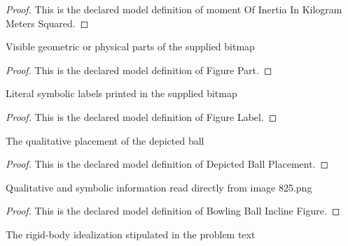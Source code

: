 \begin{proof}
  This is the declared model definition of moment Of Inertia In Kilogram Meters Squared.
\end{proof}
\begin{definition}
  \label{def:physics:phyx-mini-0825:phyxminiproblems-problemphyxmini0825-figurepart}
  Visible geometric or physical parts of the supplied bitmap
\end{definition}
\begin{proof}
  This is the declared model definition of Figure Part.
\end{proof}
\begin{definition}
  \label{def:physics:phyx-mini-0825:phyxminiproblems-problemphyxmini0825-figurelabel}
  Literal symbolic labels printed in the supplied bitmap
\end{definition}
\begin{proof}
  This is the declared model definition of Figure Label.
\end{proof}
\begin{definition}
  \label{def:physics:phyx-mini-0825:phyxminiproblems-problemphyxmini0825-depictedballplacement}
  The qualitative placement of the depicted ball
\end{definition}
\begin{proof}
  This is the declared model definition of Depicted Ball Placement.
\end{proof}
\begin{definition}
  \label{def:physics:phyx-mini-0825:phyxminiproblems-problemphyxmini0825-bowlingballinclinefigure}
  Qualitative and symbolic information read directly from image 825.png
\end{definition}
\begin{proof}
  This is the declared model definition of Bowling Ball Incline Figure.
\end{proof}
\begin{definition}
  \label{def:physics:phyx-mini-0825:phyxminiproblems-problemphyxmini0825-ballmodel}
  The rigid-body idealization stipulated in the problem text
\end{definition}
